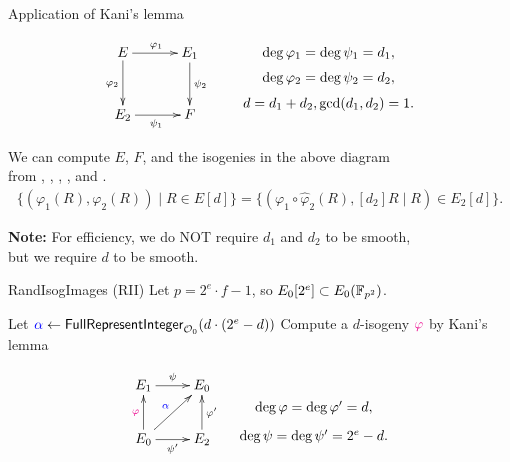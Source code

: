 \begin{frame}{Application of Kani's lemma}

    \vspace{-10pt}
    \begin{align*}
        \xymatrix@C=30pt@R=30pt{
            E \ar[r]^{\varphi_1} \ar[d]_{\varphi_2} & E_1 \ar[d]^{\psi_2}\\
            E_2 \ar[r]_{\psi_1} & F
        }
        \qquad
        \xymatrix@R=0.3em{
            \deg\varphi_1 = \deg\psi_1 = d_1,\\
            \deg\varphi_2 = \deg\psi_2 = d_2,\\
            d = d_1 + d_2, \gcd(d_1, d_2) = 1.
        }
    \end{align*}

    \vspace{10pt}
    We can compute $E$, $F$, and the isogenies in the above diagram\\
    from , , , , and .
    \begin{align*}
        \{(\varphi_1(R), \varphi_2(R)) \mid R \in E[d]\}
        = \{(\varphi_1\circ\hat{\varphi}_2(R), [d_2]R \mid R) \in E_2[d]\}.
    \end{align*}
   
    \vspace{10pt}
    \textbf{Note:}
    For efficiency, we do NOT require $d_1$ and $d_2$ to be smooth,\\
     but we require $d$ to be smooth.
\end{frame}

\begin{frame}{RandIsogImages (RII)}
    Let $p = 2^e \cdot f - 1$, so $E_0[2^e] \subset E_0(\mathbb{F}_{p^2})$.

    \vspace{5pt}
    \begin{algorithm}[H]
        \caption{\textsf{RandIsogImages} \cite{C:NakOnu24}}
        \BlankLine
        Let $\textcolor{blue}{\alpha} \leftarrow \textsf{FullRepresentInteger}_{\mathcal{O}_0}(d\cdot(2^{e} - d))$\;
        Compute a $d$-isogeny $\textcolor{magenta}{\varphi}$ by Kani's lemma\;
        \Return{$\varphi$}\;
    \end{algorithm}

    \vspace*{5pt}
    \begin{equation*}
        \xymatrix{
            E_1 \ar[r]^{\psi} & E_0\\
            E_0 \ar[u]^{\magenta{\varphi}} \ar[ur]^{\blue{\alpha}} \ar[r]_{\psi'} & E_2 \ar[u]_{\varphi'}
        }
        \hspace*{10pt}
        \xymatrix@R=5pt{
            \\
            \deg\varphi = \deg\varphi' = d,\\
            \deg\psi = \deg\psi' = 2^{e} - d.
        }
    \end{equation*}
\end{frame}